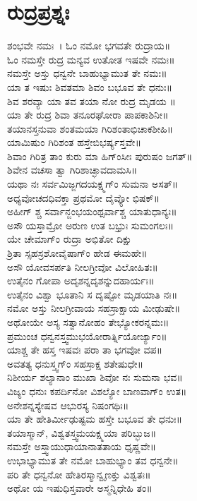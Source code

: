 \section{ರುದ್ರಪ್ರಶ್ನಃ}
ಶಂಭವೇ ನಮಃ~। ಓಂ ನಮೋ ಭಗವತೇ ರುದ್ರಾಯ॥\\
ಓಂ ನಮಸ್ತೇ ರುದ್ರ ಮನ್ಯವ ಉತೋತ ಇಷವೇ ನಮಃ॥\\
ನಮಸ್ತೇ ಅಸ್ತು ಧನ್ವನೇ ಬಾಹುಭ್ಯಾಮುತ ತೇ ನಮಃ॥\\
ಯಾ ತ ಇಷುಃ ಶಿವತಮಾ ಶಿವಂ ಬಭೂವ ತೇ ಧನುಃ॥\\
ಶಿವ ಶರವ್ಯಾ ಯಾ ತವ ತಯಾ ನೋ ರುದ್ರ ಮೃಡಯ ॥\\
ಯಾ ತೇ ರುದ್ರ ಶಿವಾ ತನೂರಘೋರಾ ಪಾಪಕಾಶಿನೀ॥\\
ತಯಾನಸ್ತನುವಾ ಶಂತಮಯಾ ಗಿರಿಶಂತಾಭಿಚಾಕಶೀಹಿ॥\\
ಯಾಮಿಷುಂ ಗಿರಿಶಂತ ಹಸ್ತೇಬಿಭರ್ಷ್ಯಸ್ತವೇ॥\\
ಶಿವಾಂ ಗಿರಿತ್ರ ತಾಂ ಕುರು ಮಾ ಹಿಗ್ಂಸೀಃ ಪುರುಷಂ ಜಗತ್॥\\
ಶಿವೇನ ವಚಸಾ ತ್ವಾ ಗಿರಿಶಾಚ್ಛಾವದಾಮಸಿ॥\\
ಯಥಾ ನಃ ಸರ್ವಮಿಜ್ಜಗದಯಕ್ಷ್ಮಗ್ಂ ಸುಮನಾ ಅಸತ್॥\\
ಅಧ್ಯವೋಚದಧಿವಕ್ತಾ ಪ್ರಥಮೋ ದೈವ್ಯೋ ಭಿಷಕ್॥\\
ಅಹೀಗ್ ಶ್ಚ ಸರ್ವಾನ್ಜಂಭಯಂಥ್ಸರ್ವಾಶ್ಚ ಯಾತುಧಾನ್ಯಃ॥\\
ಅಸೌ ಯಸ್ತಾಮ್ರೋ ಅರುಣ ಉತ ಬಭ್ರುಃ ಸುಮಂಗಲಃ॥\\
ಯೇ ಚೇಮಾಗ್ಂ ರುದ್ರಾ ಅಭಿತೋ ದಿಕ್ಷು\\ ಶ್ರಿತಾ ಸ್ಸಹಸ್ರಶೋವೈಷಾಗ್ಂ ಹೇಡ ಈಮಹೇ॥\\
ಅಸೌ ಯೋವಸರ್ಪತಿ ನೀಲಗ್ರೀವೋ ವಿಲೋಹಿತಃ॥\\
ಉತೈನಂ ಗೋಪಾ ಅದೃಶನ್ನದೃಶನ್ನುದಹಾರ್ಯಃ॥\\
ಉತೈನಂ ವಿಶ್ವಾ ಭೂತಾನಿ ಸ ದೃಷ್ಟೋ ಮೃಡಯಾತಿ ನಃ॥\\
ನಮೋ ಅಸ್ತು ನೀಲಗ್ರೀವಾಯ ಸಹಸ್ರಾಕ್ಷಾಯ ಮೀಢುಷೇ॥\\
ಅಥೋಯೇ ಅಸ್ಯ ಸತ್ವಾನೋಹಂ ತೇಭ್ಯೋಕರನ್ನಮಃ॥\\
ಪ್ರಮುಂಚ ಧನ್ವನಸ್ತ್ವಮುಭಯೋರಾರ್ತ್ನಿಯೋರ್ಜ್ಯಾಂ॥\\
ಯಾಶ್ಚ ತೇ ಹಸ್ತ ಇಷವಃ ಪರಾ ತಾ ಭಗವೋ ವಪ॥\\
ಅವತತ್ಯ ಧನುಸ್ತ್ವಗ್ಂ ಸಹಸ್ರಾಕ್ಷ ಶತೇಷುಧೇ॥\\
ನಿಶೀರ್ಯ ಶಲ್ಯಾನಾಂ ಮುಖಾ ಶಿವೋ ನಃ ಸುಮನಾ ಭವ॥\\
ವಿಜ್ಯಂ ಧನುಃ ಕಪರ್ದಿನೋ ವಿಶಲ್ಯೋ ಬಾಣವಾಗ್ಂ ಉತ॥\\
ಅನೇಶನ್ನಸ್ಯೇಷವ ಆಭುರಸ್ಯ ನಿಷಂಗಥಿಃ॥\\
ಯಾ ತೇ ಹೇತಿರ್ಮೀಢುಷ್ಟಮ ಹಸ್ತೇ ಬಭೂವ ತೇ ಧನುಃ॥\\
ತಯಾಸ್ಮಾನ್, ವಿಶ್ವತಸ್ತ್ವಮಯಕ್ಷ್ಮಯಾ ಪರಿಬ್ಭುಜ॥\\
ನಮಸ್ತೇ ಅಸ್ತ್ವಾಯುಧಾಯಾನಾತತಾಯ ಧೃಷ್ಣವೇ॥\\
ಉಭಾಭ್ಯಾಮುತ ತೇ ನಮೋ ಬಾಹುಭ್ಯಾಂ ತವ ಧನ್ವನೇ॥\\
ಪರಿ ತೇ ಧನ್ವನೋ ಹೇತಿರಸ್ಮಾನ್ವೃಣಕ್ತು ವಿಶ್ವತಃ॥\\
ಅಥೋ ಯ ಇಷುಧಿಸ್ತವಾರೇ ಅಸ್ಮನ್ನಿಧೇಹಿ ತಂ॥

